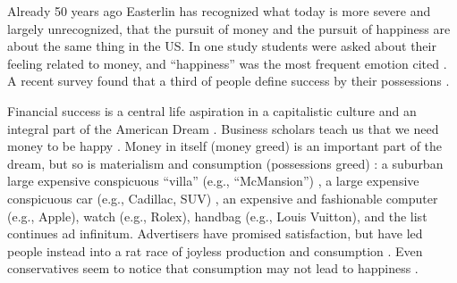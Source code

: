 \documentclass[10pt, letterpaper]{article}
\begin{document}
\begin{spacing}{1.8}
 Already 50 years ago Easterlin has recognized what today is more severe and
 largely unrecognized, that  the pursuit of money and the pursuit of happiness
 are about the same thing in the US. {In one study students were asked about their feeling related to money, and ``happiness'' was the most frequent emotion cited \citep{mogilner2010pursuit}.
A recent survey found that a third of people define success by their possessions
\citep[cited in][]{joye20}. %
}
 
% 
%
%
%
%
%

Financial success is a central life aspiration in a capitalistic culture and an
integral part of the American Dream \citep{kasser93}.
Business scholars teach us that we need  money to be happy \citep{whillans17,kushlev15,aknin13,aknin12,norton11,dunn08}.
%
Money in itself (money
greed)  is an
important part of the dream, but so is materialism and consumption (possessions
greed) \citep{kasser16,dittmar14,kasser13,leonard10}: a suburban large expensive conspicuous ``villa'' (e.g., ``McMansion'')
\citep{duany01}, a large expensive conspicuous car (e.g., Cadillac, SUV)
\citep{aok_ls_car15}, an expensive and fashionable computer (e.g., Apple), watch
(e.g., Rolex), handbag (e.g., Louis Vuitton), and the list continues ad infinitum.
%
Advertisers have promised satisfaction, but have led people instead into a rat
race of joyless production and consumption \citep{cederstrom18}.
 Even conservatives seem to notice that consumption may not lead to happiness \citep{brooksATL20oct22}.


\end{spacing}
\end{document}
